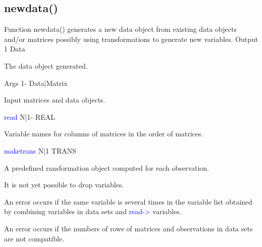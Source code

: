\subsection{\textcolor{VioletRed}{newdata}()}
\label{newdata}
Function \textcolor{VioletRed}{newdata}() generates a new data object from existing data objects and/or
matrices possibly using transformations to generate new variables.
\vspace{0.3cm}
\hline
\vspace{0.3cm}
\noindent Output \tabto{3cm} 1 \tabto{5cm}  Data \tabto{7cm}
\begin{changemargin}{3cm}{0cm}
\noindent The data object generated.
\end{changemargin}
\vspace{0.3cm}
\hline
\vspace{0.3cm}
\noindent Args \tabto{3cm} 1- \tabto{5cm}  Data|Matrix \tabto{7cm}
\begin{changemargin}{3cm}{0cm}
\noindent  Input matrices and data objects.
\end{changemargin}
\vspace{0.3cm}
\hline
\vspace{0.3cm}
\noindent \textcolor{blue}{read} \tabto{3cm} N|1- \tabto{5cm}  REAL \tabto{7cm}
\begin{changemargin}{3cm}{0cm}
\noindent  Variable names for columns of matrices in the order of
matrices.
\end{changemargin}
\vspace{0.3cm}
\hline
\vspace{0.3cm}
\noindent \textcolor{blue}{maketrans} \tabto{3cm} N|1 \tabto{5cm}   TRANS  \tabto{7cm}
\begin{changemargin}{3cm}{0cm}
\noindent  A predefined ransformation object computed for each observation.
\end {changemargin}
\hline
\vspace{0.2cm}
\begin{note}
It is not yet possible to drop variables.
\end{note}
\begin{note}
An error occurs if the same variable is several times in the variable list obtained
by combining variables in data sets and \textcolor{blue}{read->} variables.
\end{note}
\begin{note}
An error occurs if the numbers of rows of matrices and observations in data sets
are not compatible.
\end{note}
